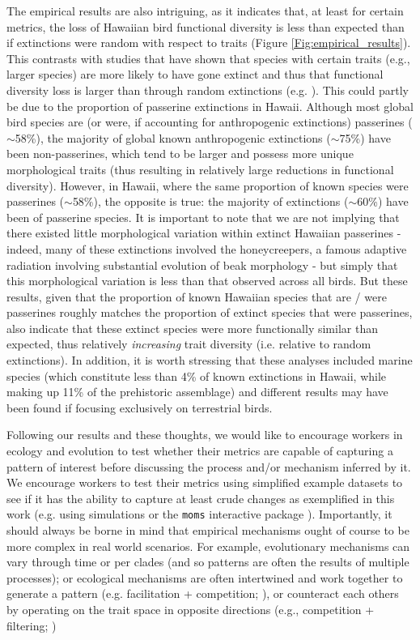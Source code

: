 \documentclass[12pt,letterpaper]{article}
\begin{document}
The empirical results are also intriguing, as it indicates that, at least for certain metrics, the loss of Hawaiian bird functional diversity is less than expected than if extinctions were random with respect to traits (Figure \ref{Fig:empirical_results}).
This contrasts with studies that have shown that species with certain traits (e.g., larger species) are more likely to have gone extinct and thus that functional diversity loss is larger than through random extinctions (e.g. \citealt{sayol2021loss,Matthews2022}).
This could partly be due to the proportion of passerine extinctions in Hawaii.
Although most global bird species are (or were, if accounting for anthropogenic extinctions) passerines ($\sim$58\%), the majority of global known anthropogenic extinctions ($\sim$75\%) have been non-passerines, which tend to be larger and possess more unique morphological traits (thus resulting in relatively large reductions in functional diversity).
However, in Hawaii, where the same proportion of known species were passerines ($\sim$58\%), the opposite is true: the majority of extinctions ($\sim$60\%) have been of passerine species.
It is important to note that we are not implying that there existed little morphological variation within extinct Hawaiian passerines - indeed, many of these extinctions involved the honeycreepers, a famous adaptive radiation involving substantial evolution of beak morphology \citep{Walther2022} - but simply that this morphological variation is less than that observed across all birds.
But these results, given that the proportion of known Hawaiian species that are / were passerines roughly matches the proportion of extinct species that were passerines,  also indicate that these extinct species were more functionally similar than expected, thus relatively \textit{increasing} trait diversity (i.e. relative to random extinctions).
In addition, it is worth stressing that these analyses included marine species (which constitute less than 4\% of  known extinctions in Hawaii, while making up 11\% of the prehistoric assemblage) and different results may have been found if focusing exclusively on terrestrial birds.

Following our results and these thoughts, we would like to encourage workers in ecology and evolution to test whether their metrics are capable of capturing a pattern of interest before discussing the process and/or mechanism inferred by it.
We encourage workers to test their metrics using simplified example datasets to see if it has the ability to capture at least crude changes as exemplified in this work (e.g. using simulations \citealt{guillerme2024treats} or the \texttt{moms} interactive package \citealt{guillerme2020shifting}).
Importantly, it should always be borne in mind that empirical mechanisms ought of course to be more complex in real world scenarios.
For example, evolutionary mechanisms can vary through time or per clades (and so patterns are often the results of multiple processes); or ecological mechanisms are often intertwined and work together to generate a pattern (e.g. facilitation + competition; \citealt{danet2024species}), or counteract each others by operating on the trait space in opposite directions (e.g., competition + filtering; \citealt{mammola2024functional})
\end{document}
